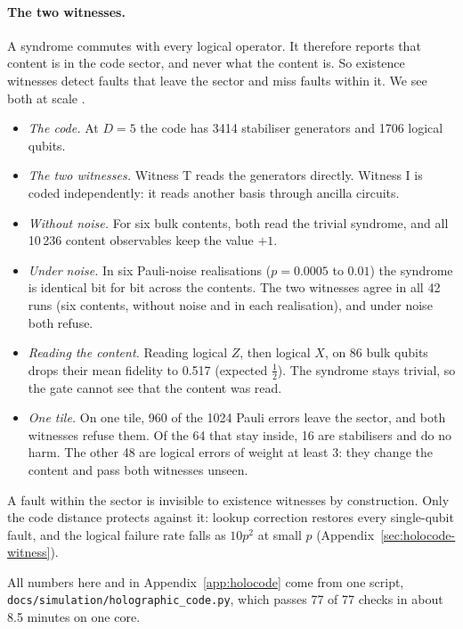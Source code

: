 \paragraph{The two witnesses.} A syndrome commutes with every logical operator. It therefore reports
that content is in the code sector, and never what the content is. So existence witnesses detect faults that leave the sector and miss
faults within it. We see both at scale .
\begin{itemize}[nosep]
\item \emph{The code.} At $D=5$ the code has 3414 stabiliser generators and 1706 logical qubits.
\item \emph{The two witnesses.} Witness T reads the generators directly. Witness I is coded independently: it reads another basis
  through ancilla circuits.
\item \emph{Without noise.} For six bulk contents, both read the trivial syndrome, and all 10\,236 content observables keep the value
  $+1$.
\item \emph{Under noise.} In six Pauli-noise realisations ($p=0.0005$ to $0.01$) the syndrome is identical bit for bit across the
  contents. The two witnesses agree in all 42 runs (six contents, without noise and in each
  realisation), and under noise both refuse.
\item \emph{Reading the content.} Reading logical $Z$, then logical $X$, on 86 bulk qubits drops their mean fidelity to 0.517 (expected
  $\frac12$). The syndrome stays trivial, so the gate cannot see that the content was read.
\item \emph{One tile.} On one tile, 960 of the 1024 Pauli errors leave the sector, and both witnesses refuse them. Of the 64 that stay
  inside, 16 are stabilisers and do no harm. The other 48 are logical errors of weight at least 3: they change the content and pass
  both witnesses unseen.
\end{itemize}
A fault within the sector is invisible to existence witnesses by construction. Only the code distance protects against it: lookup
correction restores every single-qubit fault, and the logical failure rate falls as $10p^2$ at small $p$
(Appendix~\ref{sec:holocode-witness}).

All numbers here and in Appendix~\ref{app:holocode} come from one script,
\texttt{docs/\allowbreak simulation/\allowbreak holographic\_code.py}, which passes 77 of 77 checks in about 8.5 minutes on one core.

